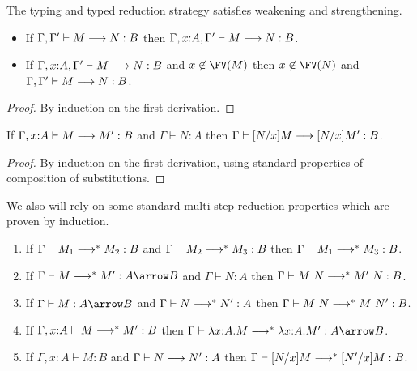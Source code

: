 The typing and typed reduction strategy satisfies weakening and
strengthening.

\begin{lemma}\label{lem:redprop}\quad
  \begin{itemize}
  \item If $\Gamma, \Gamma' \vdash M \longrightarrow N : B$ then $\Gamma, x{:}A, \Gamma' \vdash M \longrightarrow N : B$.
  \item If $\Gamma, x{:}A, \Gamma' \vdash M \longrightarrow N : B$ and $x \not\in \FV(M)$ then
        $x \not\in \FV(N)$ and $\Gamma, \Gamma' \vdash M \longrightarrow N : B$.
  \end{itemize}
\end{lemma}
\begin{proof}
By induction on the first derivation.
\end{proof}


\begin{lemma}\label{lem:redsubst}\quad
If $\Gamma, x{:}A \vdash M \longrightarrow M' : B$ and $\Gamma \vdash N : A$ then
$\Gamma \vdash [N/x]M \longrightarrow [N/x]M' : B$.
\end{lemma}
\begin{proof}
By induction on the first derivation, using standard properties of composition of substitutions.
\end{proof}


We also will rely on some standard multi-step reduction properties
which are proven by induction.

\begin{lemma}\label{lm:mredprop}
\quad
\begin{enumerate}
\item\label{lm:mredtrans} If $\Gamma \vdash M_1 \longrightarrow^* M_2 : B$ and $\Gamma \vdash M_2 \longrightarrow^* M_3 : B$ then $\Gamma \vdash M_1 \longrightarrow^* M_3 : B$.
\item\label{lm:mredappl} If $\Gamma \vdash M \mred M' : A \arrow B$
  and $\Gamma \vdash N : A$ 
  then $\Gamma \vdash M~N \longrightarrow^* M'~N : B$.
\item\label{lm:mredappr} If $\Gamma \vdash M : A \arrow B$ and $\Gamma \vdash N \longrightarrow^* N' : A$ then $\Gamma \vdash M~N \longrightarrow^* M~N' : B$.
\item\label{lm:mredabs} If $\Gamma,x{:}A \vdash M \longrightarrow^* M' : B$ then $\Gamma \vdash \lambda x{:}A.M \mred \lambda x{:}A.M' : A \arrow B$.
\item\label{lm:mredsubs} If $\Gamma, x{:}A \vdash M : B$ and $\Gamma \vdash N \longrightarrow N' : A$
then $ \Gamma \vdash [N/x]M \longrightarrow^* [N'/x]M : B$.
\end{enumerate}
\end{lemma}



